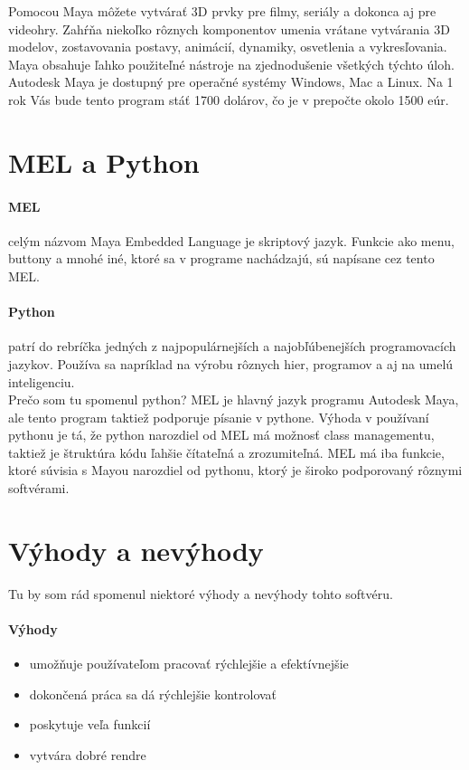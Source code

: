 \documentclass[10pt,oneside,slovak,a4paper]{article}
\begin{document}
Pomocou Maya môžete vytvárať 3D prvky pre filmy, seriály a dokonca aj pre videohry. Zahŕňa niekoľko rôznych komponentov umenia vrátane vytvárania 3D modelov, zostavovania postavy, animácií, dynamiky, osvetlenia a vykresľovania. Maya obsahuje ľahko použiteľné nástroje na zjednodušenie všetkých týchto úloh.\\

Autodesk Maya je dostupný pre operačné systémy Windows, Mac a Linux. Na 1 rok Vás bude tento program stáť 1700 dolárov, čo je v prepočte okolo 1500 eúr.



\section{MEL a Python} \label{python}
\paragraph{MEL}
celým názvom Maya Embedded Language je skriptový jazyk. Funkcie ako menu, buttony a mnohé iné, ktoré sa v programe nachádzajú, sú napísane cez tento MEL.
\paragraph{Python}
patrí do rebríčka jedných z najpopulárnejších a najobľúbenejších programovacích jazykov. Používa sa napríklad na výrobu rôznych hier, programov a aj na umelú inteligenciu.\\

Prečo som tu spomenul python? MEL je hlavný jazyk programu Autodesk Maya, ale tento program taktiež podporuje písanie v pythone. Výhoda v používaní pythonu je tá, že python narozdiel od MEL má možnosť class managementu, taktiež je štruktúra kódu ľahšie čítateľná a zrozumiteľná. MEL má iba funkcie, ktoré súvisia s Mayou narozdiel od pythonu, ktorý je široko podporovaný rôznymi softvérami.\cite{evaluationmaya}



\section{Výhody a nevýhody} \label{vyhnevyh}
Tu by som rád spomenul niektoré výhody a nevýhody tohto softvéru.

\paragraph{Výhody}
\begin{itemize}
\item umožňuje používateľom pracovať rýchlejšie a efektívnejšie
\item dokončená práca sa dá rýchlejšie kontrolovať\cite{educbaa2021}
\item poskytuje veľa funkcií
\item vytvára dobré rendre
\end{itemize}
\end{document}
